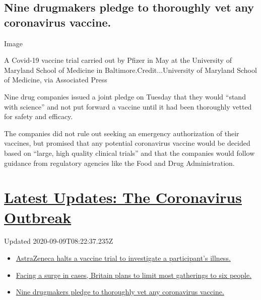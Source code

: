 \hypertarget{nine-drugmakers-pledge-to-thoroughly-vet-any-coronavirus-vaccine}{%
\subsection{Nine drugmakers pledge to thoroughly vet any coronavirus
vaccine.}\label{nine-drugmakers-pledge-to-thoroughly-vet-any-coronavirus-vaccine}}

Image

A Covid-19 vaccine trial carried out by Pfizer in May at the University
of Maryland School of Medicine in Baltimore.Credit...University of
Maryland School of Medicine, via Associated Press

Nine drug companies issued a joint pledge on Tuesday that they would
``stand with science'' and not put forward a vaccine until it had been
thoroughly vetted for safety and efficacy.

The companies did not rule out seeking an emergency authorization of
their vaccines, but promised that any potential coronavirus vaccine
would be decided based on ``large, high quality clinical trials'' and
that the companies would follow guidance from regulatory agencies like
the Food and Drug Administration.

\hypertarget{latest-updates-the-coronavirus-outbreak}{%
\section{\texorpdfstring{\href{https://www.nytimes3xbfgragh.onion/2020/09/08/world/covid-19-coronavirus.html?action=click\&pgtype=Article\&state=default\&region=MAIN_CONTENT_1\&context=storylines_live_updates}{Latest
Updates: The Coronavirus
Outbreak}}{Latest Updates: The Coronavirus Outbreak}}\label{latest-updates-the-coronavirus-outbreak}}

Updated 2020-09-09T08:22:37.235Z

\begin{itemize}
\tightlist
\item
  \href{https://www.nytimes3xbfgragh.onion/2020/09/08/world/covid-19-coronavirus.html?action=click\&pgtype=Article\&state=default\&region=MAIN_CONTENT_1\&context=storylines_live_updates\#link-313b443d}{AstraZeneca
  halts a vaccine trial to investigate a participant's illness.}
\item
  \href{https://www.nytimes3xbfgragh.onion/2020/09/08/world/covid-19-coronavirus.html?action=click\&pgtype=Article\&state=default\&region=MAIN_CONTENT_1\&context=storylines_live_updates\#link-4438dd7}{Facing
  a surge in cases, Britain plans to limit most gatherings to six
  people.}
\item
  \href{https://www.nytimes3xbfgragh.onion/2020/09/08/world/covid-19-coronavirus.html?action=click\&pgtype=Article\&state=default\&region=MAIN_CONTENT_1\&context=storylines_live_updates\#link-679303d7}{Nine
  drugmakers pledge to thoroughly vet any coronavirus vaccine.}
\end{itemize}

